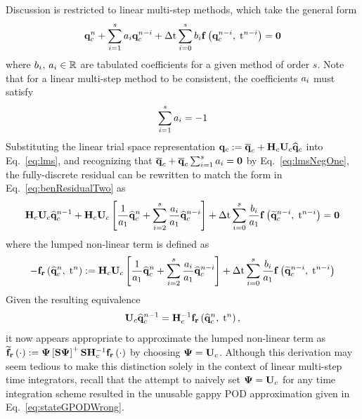 Discussion is restricted to linear multi-step methods, which take the general form
%
\begin{equation}\label{eq:lms}
	\mathbf{q}_{c}^{n} + \sum_{i=1}^{s} a_{i} \mathbf{q}_{c}^{n-i} + \Delta \text{t} \sum_{i=0}^{s} b_{i} \mathbf{f} \left(\mathbf{q}_{c}^{n-i}, \; \text{t}^{n-i}\right) = \mathbf{0}
\end{equation}
%
where $b_{i}$, $a_{i} \in \mathbb{R}$ are tabulated coefficients for a given method of order $s$. Note that for a linear multi-step method to be consistent, the coefficients $a_{i}$ must satisfy
%
\begin{equation}\label{eq:lmsNegOne}
	\sum_{i=1}^{s} a_{i} = -1
\end{equation}
%
Substituting the linear trial space representation $\consVec \defEq \consVecCent + \consScale \consTrial \consVecCoef$ into Eq.~\ref{eq:lms}, and recognizing that $\mathbf{\overline{q}}_{c} + \mathbf{\overline{q}}_{c} \sum_{i=1}^{s} a_{i} = \mathbf{0}$ by Eq.~\ref{eq:lmsNegOne}, the fully-discrete residual can be rewritten to match the form in Eq.~\ref{eq:benResidualTwo} as
%
\begin{equation}
	\consScale \consTrial \consVecCoef^{\timeIdx-1} + \consScale \consTrial \left[\frac{1}{a_1} \consVecCoef^{\timeIdx} + \sum_{\dummyIdx=2}^{s} \frac{a_{\dummyIdx}}{a_1} \consVecCoef^{\timeIdx-\dummyIdx}\right] + \dt \sum_{\dummyIdx=0}^{s} \frac{b_{\dummyIdx}}{a_1} \rhsFunc{\consVecRom^{\timeIdx-\dummyIdx}, \; \timeVar^{\timeIdx-\dummyIdx}} = \zeroVec
\end{equation}
%
where the lumped non-linear term is defined as
%
\begin{equation}
	-\rhsResFunc{\consVecCoef^{\timeIdx},\; \timeVar^{\timeIdx}} \defEq \consScale \consTrial \left[\frac{1}{a_1} \consVecCoef^{\timeIdx} + \sum_{\dummyIdx=2}^{s} \frac{a_{\dummyIdx}}{a_1} \consVecCoef^{\timeIdx-\dummyIdx}\right] + \dt \sum_{\dummyIdx=0}^{s} \frac{b_{\dummyIdx}}{a_1} \rhsFunc{\consVecRom^{\timeIdx-\dummyIdx}, \; \timeVar^{\timeIdx-\dummyIdx}}
\end{equation}
%
Given the resulting equivalence
%
\begin{equation}
	\consTrial \consVecCoef^{\timeIdx-1} = \consScaleInv \rhsResFunc{\consVecCoef^{\timeIdx},\; \timeVar^{\timeIdx}},
\end{equation}
%
it now appears appropriate to approximate the lumped non-linear term as $\rhsResApproxFunc{\cdot} \defEq \deimBasis \left[\sampMat \deimBasis\right]^+ \sampMat \consScaleInv \rhsResFunc{\cdot}$ by choosing $\deimBasis = \consTrial$. Although this derivation may seem tedious to make this distinction solely in the context of linear multi-step time integrators, recall that the attempt to naively set $\deimBasis = \consTrial$ for any time integration scheme resulted in the unusable gappy POD approximation given in Eq.~\ref{eq:stateGPODWrong}.

